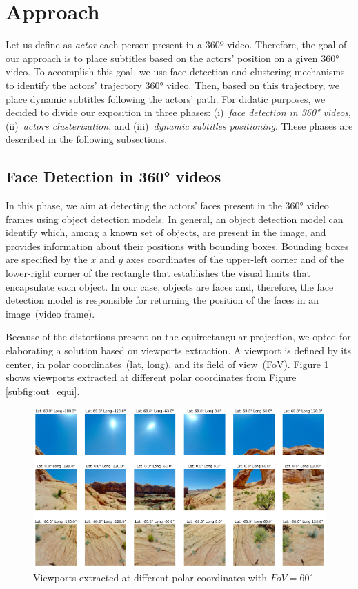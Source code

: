 \section{Approach}
\label{sec:approach}
Let us define as \emph{actor} each person present in a 360º video. Therefore, the goal of our approach is to place subtitles based on the actors' position on a given 360° video. To accomplish this goal, we use face detection and clustering mechanisms to identify the actors' trajectory 360° video. Then, based on this trajectory, we place dynamic subtitles following the actors' path. For didatic purposes, we decided to divide our exposition in three phases: (i)~\emph{face detection in 360° videos}, (ii)~\emph{actors clusterization}, and (iii)~\emph{dynamic subtitles positioning}. These phases are described in the following subsections. 

\subsection{Face Detection in 360° videos}

In this phase, we aim at detecting the actors' faces present in the 360° video frames using object detection models.
In general, an object detection model can identify which, among a known set of objects, are present in the image, and provides information about their positions with bounding boxes.
Bounding boxes are specified by the $x$ and $y$ axes coordinates of the upper-left corner and of the lower-right corner of the rectangle that establishes the visual limits that encapsulate each object.
In our case, objects are faces and, therefore, the face detection model is responsible for returning the position of the faces in an image~(video frame).

Because of the distortions present on the equirectangular projection, we opted for elaborating a solution based on viewports extraction. A viewport is defined by its center, in polar coordinates~(lat, long), and its field of view~(FoV). Figure \ref{fig:viewports} shows viewports extracted at different polar coordinates from Figure \ref{subfig:out_equi}.

\begin{figure}[!ht]
    \centering
    \includegraphics[width=1\textwidth]{img/viewports.png}
    \caption{Viewports extracted at different polar coordinates with $FoV = 60^{\circ}$}
    \label{fig:viewports}
\end{figure}

